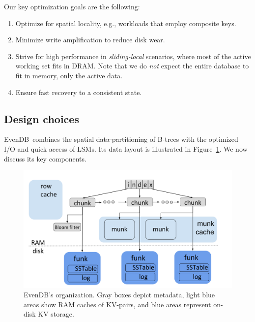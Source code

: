 \documentclass[sigplan,10pt]{acmart}
\newcommand{\remove}[1]{}
\newcommand{\sys}{EvenDB}
\providecommand{\DIFadd}[1]{{\protect\color{blue}\uwave{#1}}} %
\providecommand{\DIFdel}[1]{{\protect\color{red}\sout{#1}}}                      %
\providecommand{\DIFaddbegin}{} %
\providecommand{\DIFaddend}{} %
\providecommand{\DIFdelbegin}{} %
\providecommand{\DIFdelend}{} %
\begin{document}
Our key optimization goals are the following:
\begin{enumerate}
\item Optimize for {spatial locality}, e.g., workloads that employ composite keys.
\remove{
 Many NoSQL applications embed multi-dimensional data in a single-dimension composite key. 
 This design provides high spatial locality on the primary dimension (key prefix). We strive
 to express this locality in physical data organization.
 }

\item Minimize {write amplification}  to reduce disk wear.%

\item %
Strive for high performance in  \emph{sliding-local} scenarios, where most of the active working set fits in DRAM. 
Note that we do \emph{not} expect the entire database to fit in
memory, only the active data.  

\item Ensure {fast recovery} to a consistent state.  
\end{enumerate}

\subsection{Design choices}

\sys\ combines the spatial \DIFdelbegin \DIFdel{data partitioning }\DIFdelend \DIFaddbegin \DIFadd{locality }\DIFaddend of B-trees with the optimized I/O and quick access of LSMs. 
Its data layout is illustrated in Figure~\ref{fig:piwi}.  We now discuss its key components.   

\begin{figure}[tb]
\includegraphics[width=\columnwidth]{PiWi.png}
\caption{\sys's  organization. Gray boxes depict metadata, light blue areas show RAM caches of KV-pairs, and blue areas represent on-disk KV storage.}
\label{fig:piwi}
\end{figure}
\end{document}
